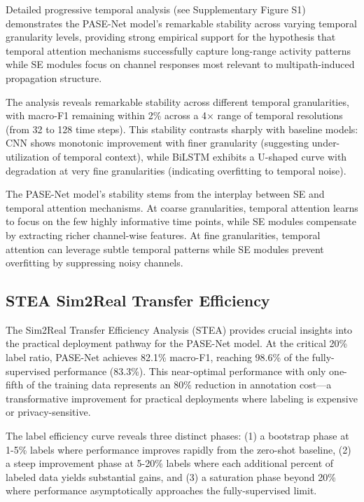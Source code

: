 \documentclass[lettersize,journal]{IEEEtran}
\begin{document}
Detailed progressive temporal analysis (see Supplementary Figure S1) demonstrates the PASE-Net model's remarkable stability across varying temporal granularity levels, providing strong empirical support for the hypothesis that temporal attention mechanisms successfully capture long-range activity patterns while SE modules focus on channel responses most relevant to multipath-induced propagation structure.

The analysis reveals remarkable stability across different temporal granularities, with macro-F1 remaining within 2\% across a 4× range of temporal resolutions (from 32 to 128 time steps). This stability contrasts sharply with baseline models: CNN shows monotonic improvement with finer granularity (suggesting under-utilization of temporal context), while BiLSTM exhibits a U-shaped curve with degradation at very fine granularities (indicating overfitting to temporal noise).

The PASE-Net model's stability stems from the interplay between SE and temporal attention mechanisms. At coarse granularities, temporal attention learns to focus on the few highly informative time points, while SE modules compensate by extracting richer channel-wise features. At fine granularities, temporal attention can leverage subtle temporal patterns while SE modules prevent overfitting by suppressing noisy channels.

\subsection{STEA Sim2Real Transfer Efficiency}

The Sim2Real Transfer Efficiency Analysis (STEA) provides crucial insights into the practical deployment pathway for the PASE-Net model. At the critical 20\% label ratio, PASE-Net achieves 82.1\% macro-F1, reaching 98.6\% of the fully-supervised performance (83.3\%). This near-optimal performance with only one-fifth of the training data represents an 80\% reduction in annotation cost—a transformative improvement for practical deployments where labeling is expensive or privacy-sensitive.

The label efficiency curve reveals three distinct phases: (1) a bootstrap phase at 1-5\% labels where performance improves rapidly from the zero-shot baseline, (2) a steep improvement phase at 5-20\% labels where each additional percent of labeled data yields substantial gains, and (3) a saturation phase beyond 20\% where performance asymptotically approaches the fully-supervised limit.
\end{document}
